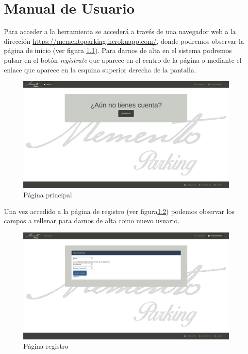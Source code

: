 \chapter{Manual de Usuario}
\label{chap:manual}
Para acceder a la herramienta se accederá a través de una navegador web a la dirección \url{https://mementoparking.herokuapp.com/}, donde podremos observar la página de inicio (ver figura \ref{fig:home}). Para darnos de alta en el sistema podremos pulsar en el botón \textit{regístrate} que aparece en el centro de la página o mediante el enlace que aparece en la esquina superior derecha de la pantalla.

	\begin{figure}[h!]
		\centering
		\includegraphics[width=15cm, fbox={\fboxrule} 4mm]{images/06-manual/01-home.png}
		\caption{Página principal}
		\label{fig:home}
	\end{figure}

Una vez accedido a la página de registro (ver figura\ref{fig:register}) podemos observar los campos a rellenar para darnos de alta como nuevo usuario.

	\begin{figure}[h!]
		\centering
		\includegraphics[width=15cm, fbox={\fboxrule} 4mm]{images/06-manual/02-register.png}
		\caption{Página registro}
		\label{fig:register}
	\end{figure}
	
